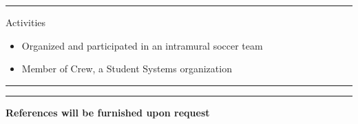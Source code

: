 \documentclass[10pt]{letter}
\begin{document}
\rule{\linewidth}{.5pt}

{\Large Activities}
\begin{itemize}
\setlength\itemsep{1pt}
\item Organized and participated in an intramural soccer team
\item Member of Crew, a Student Systems organization
\end{itemize}

\rule{\linewidth}{.5pt}

\vspace{-15pt}

\rule{\linewidth}{.5pt}

\begin{center}\textbf{References will be furnished upon request}\end{center}
\end{document}
